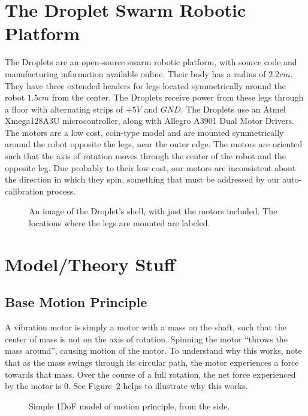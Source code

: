 \documentclass[letterpaper, 10pt, conference]{ieeeconf}
\begin{document}
\section{The Droplet Swarm Robotic Platform}
The Droplets are an open-source swarm robotic platform, with source code and manufacturing information available online. Their body has a radius of $2.2cm$. They have three extended headers for legs located symmetrically around the robot $1.5cm$ from the center. The Droplets receive power from these legs through a floor with alternating strips of $+5V$ and $GND$. The Droplets use an Atmel Xmega128A3U microcontroller, along with Allegro A3901 Dual Motor Drivers. The motors are a low cost, coin-type model and are mounted symmetrically around the robot opposite the legs, near the outer edge. The motors are oriented such that the axis of rotation moves through the center of the robot and the opposite leg. Due probably to their low cost, our motors are inconsistent about the direction in which they spin, something that must be addressed by our auto-calibration process.

\begin{figure}[h]
	\centering
	
	\caption{An image of the Droplet's shell, with just the motors included. The locations where the legs are mounted are labeled.}
	\label{motorLocations}
\end{figure}

\section{Model/Theory Stuff}

\subsection{Base Motion Principle}
A vibration motor is simply a motor with a mass on the shaft, such that the center of mass is not on the axis of rotation. Spinning the motor ``throws the mass around'', causing motion of the motor. To understand why this works, note that as the mass swings through its circular path, the motor experiences a force towards that mass. Over the course of a full rotation, the net force experienced by the motor is 0. See Figure~\ref{motorDiagram} helps to illustrate why this works.

\begin{figure}
\centering

\caption{Simple 1DoF model of motion principle, from the side.}
\label{motorDiagram}
\end{figure}
\end{document}
